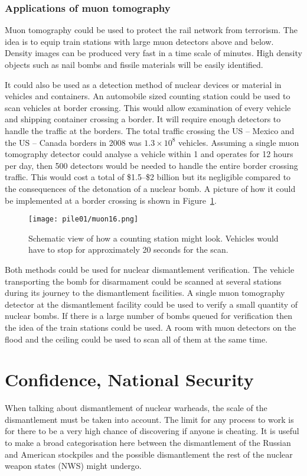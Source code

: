 \documentclass[twoside,titlepage,11pt,twocolumn,a4paper]{article}
\begin{document}
\subsubsection{Applications of muon tomography}
Muon tomography could be used to protect the rail network from
terrorism. The idea is to equip train stations with large muon
detectors above and below. Density images can be produced very fast in
a time scale of minutes. High density objects such as nail bombs and
fissile materials will be easily identified. \citep{nichol}

It could also be used as a detection method of nuclear devices or
material in vehicles and containers.  An automobile sized counting
station could be used to scan vehicles at border crossing. This would
allow examination of every vehicle and shipping container crossing a
border. It will require enough detectors to handle the traffic at the
borders. The total traffic crossing the US -- Mexico and the US --
Canada borders in 2008 was \(1.3\times10^8\) vehicles. Assuming a
single muon tomography detector could analyse a vehicle within
\unit{1}{\minute} and operates for 12 hours per day, then 500
detectors would be needed to handle the entire border crossing
traffic. This would cost a total of \$1.5--\$2 billion but its
negligible compared to the consequences of the detonation of a nuclear
bomb. A picture of how it could be implemented at a border crossing is
shown in Figure~\ref{fig:muon16}. \citep{morris2008}

\begin{figure}
  \texttt{[image: pile01/muon16.png]}
  \caption{Schematic view of how a counting station might
    look. Vehicles would have to stop for approximately 20 seconds for
    the scan. \citep{morris2008}}
  \label{fig:muon16}
\end{figure}

Both methods could be used for nuclear dismantlement verification. The
vehicle transporting the bomb for disarmament could be scanned at
several stations during its journey to the dismantlement facilities. A
single muon tomography detector at the dismantlement facility could be
used to verify a small quantity of nuclear bombs. If there is a large
number of bombs queued for verification then the idea of the train
stations could be used. A room with muon detectors on the flood and
the ceiling could be used to scan all of them at the same time.

\section{Confidence, National Security}
When talking about dismantlement of nuclear warheads, the scale of the
dismantlement must be taken into account. The limit for any process to
work is for there to be a very high chance of discovering if anyone is
cheating. It is useful to make a broad categorisation here between the
dismantlement of the Russian and American stockpiles and the possible
dismantlement the rest of the nuclear weapon states (NWS) might
undergo.
\end{document}
